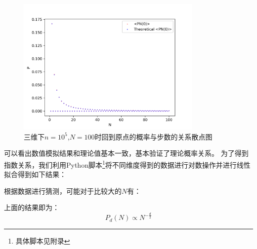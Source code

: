 \documentclass[a4paper,11pt]{article}
\begin{document}
\begin{figure}[!htbp]        
\centering
\includegraphics[width=9cm]{3-105.png}      
\caption{ 三维下$n=10^{5}$,$N=100$时回到原点的概率与步数的关系散点图}      
\end{figure}
	


\newpage
可以看出数值模拟结果和理论值基本一致，基本验证了理论概率关系。
为了得到指数关系，我们利用Python脚本\footnote{具体脚本见附录}将不同维度得到的数据进行对数操作并进行线性拟合得到如下结果：

\begin{table}[!htbp]
\centering
{}
\caption{$n=10^{6}$,$N=1000$时不同维度的线性拟合结果}
\end{table}

根据数据进行猜测，可能对于比较大的$N$有：
\begin{table}[!htbp]
\centering
{}
\caption{不同维度的指数关系猜测}
\end{table}

上面的结果即为：
\begin{equation}
	P_{d}(N) \propto N^{-\frac{d}{2}}
\end{equation}
\end{document}
